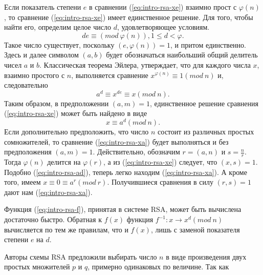   Если показатель степени $e$ в сравнении (\ref{eq:intro-rsa-xe}) взаимно прост с $\varphi(n)$, то сравнение (\ref{eq:intro-rsa-xe}) имеет единственное решение. 
Для того, чтобы найти его, определим целое число $d$, удовлетворяющее условиям. 
\begin{equation} \label{eq:intro-rsa-de}
 d e \equiv (mod \: \varphi(n)), 1 \leq d < \varphi.
\end{equation}
Такое число существует, поскольку $(e, \varphi(n)) = 1$, и притом единственно. Здесь и далее символом $(a, b)$ будет обозначаться 
наибольший общий делитель чисел $a$ и $b$. Классическая теорема Эйлера, утверждает, что для каждого числа $x$, взаимно простого 
с $n$, выполняется сравнение $x^{\varphi(n)} \equiv 1 (mod \: n)$ и, следовательно
\begin{equation} \label{eq:intro-rsa-ad}
 a^{ d} \equiv x^{ d e} \equiv x (mod \: n).
\end{equation}
Таким образом, в предположении $(a, m) = 1$, единственное решение сравнения (\ref{eq:intro-rsa-xe}) может быть найдено в виде
\begin{equation} \label{eq:intro-rsa-xa}
 x \equiv a^{ d} (mod \: n).
\end{equation}
Если дополнительно предположить, что число $n$ состоит из различных простых сомножителей, то сравнение (\ref{eq:intro-rsa-xa}) будет выполняться и без 
предположения $(a, m) = 1$. Действительно, обозначим $r = (a, n)$ и $s = \frac{n}{r}$. Тогда $\varphi(n)$ делится на $\varphi(r)$, 
а из (\ref{eq:intro-rsa-xe}) следует, что $(x, s) = 1$. Подобно (\ref{eq:intro-rsa-ad}), теперь легко находим (\ref{eq:intro-rsa-xa}). А кроме того, имеем $x \equiv 0 \equiv a^{ r} (mod \: r)$. 
Получившиеся сравнения в силу $(r, s) = 1$ дают нам (\ref{eq:intro-rsa-xa}).

  Функция (\ref{eq:intro-rsa-f}), принятая в системе RSA, может быть вычислена достаточно быстро. Обратная к $f(x)$ функция 
$f^{ -1} : x \rightarrow x^{ d} (mod \: n)$ вычисляется по тем же правилам, что и $f(x)$, 
лишь с заменой показателя степени $e$ на $d$.
\begin{comment}
  Для вычисления функции (\ref{eq:intro-rsa-f}) достаточно знать лишь числа \textit{e} и \textit{n}. Именно они составляют открытый ключ для шифрования. 
А вот для вычисления обратной функции требуется знать число \textit{d}. Казалось бы, ничего не стоит, зная число \textit{n}, разложить 
его на простые сомножители, вычислить затем с помощью известных правил значение \textit{{$\varphi$}(n)} и, наконец, с помощью (3.3) определить 
нужное число \textit{d}. Все шаги этого вычисления могут быть реализованы достаточно быстро, за исключением первого. Именно разложение числа \textit{n} на 
простые множители и составляет наиболее трудоемкую часть вычислений. В теории чисел несмотря на многолетнюю её историю и на очень интенсивные поиски в течение последних 20 лет, 
эффективный алгоритм разложения натуральных чисел на множители так и не найден.
\end{comment}
  Авторы схемы RSA предложили выбирать число $n$ в виде произведения двух простых множителей $p$ и $q$, примерно одинаковых по 
величине. Так как 

